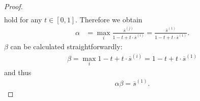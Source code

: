 \documentclass{article}
\newtheorem{lemma}[theorem]{Lemma}
\begin{document}
\begin{proof}
\begin{align*}
		\end{align*}
		hold for any $t \in [0, 1]$. Therefore we obtain
		\begin{align*}
		\alpha &= \max_{i}{\frac{\overline{s}^{(j)}}{1-t + t\cdot \overline{s}^{(i)}}} = \frac{\overline{s}^{(1)}}{1-t + t\cdot \overline{s}^{(1)}}.
		\end{align*}
		$\beta$ can be calculated straightforwardly:
		\begin{align*}
		\beta = \max_{i}{1-t + t\cdot \overline{s}^{(i)}} = 1-t + t\cdot \overline{s}^{(1)}
		\end{align*}
		and thus
		\begin{align*}
		\alpha\beta = \overline{s}^{(1)}.
		\end{align*}
		\fi
\end{proof}



	
\end{document}
